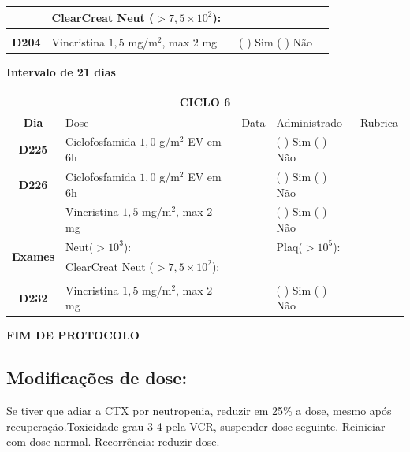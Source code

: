 \documentclass[11pt,a4paper,oldfontcommands]{memoir}
\begin{document}
\begin{center}
\begin{table}[H]
\begin{tabular}{p{1cm}p{6cm}|p{1cm}|p{3cm}|p{2.5cm}}
    \cline{2-5}
    \multicolumn{1}{c|}{\multirow{2}{*}{{}}}&\multicolumn{2}{l|}{ClearCreat Neut (\(>7,5\times10^2\)):}&{}&{}\\
    \hline
    \\
    \hline
    \multicolumn{1}{c|}{\multirow{1}{*}{\textbf{D204}}}&{Vincristina \(1,5\) mg/m\(^2\), max \(2\) mg}&&{(  ) Sim (  ) Não}&\\
    \hline
\end{tabular}
\end{table}
\textbf{Intervalo de 21 dias}
\begin{table}[H]
\begin{tabular}{p{1cm}p{6cm}|p{1cm}|p{3cm}|p{2.5cm}}
    \hline
	\multicolumn{5}{c}{\textbf{CICLO 6}}\\
	\hline
    \multicolumn{1}{c|}{\multirow{1}{*}{\textbf{Dia}}}&{Dose}&{Data}&{Administrado}&{Rubrica} \\
    \hline
    \multicolumn{1}{c|}{\multirow{1}{*}{\textbf{D225}}}&{Ciclofosfamida \(1,0\) g/m\(^2\) EV em 6h}&&{(  ) Sim (  ) Não}&\\
    \multicolumn{1}{c|}{\multirow{1}{*}{\textbf{D226}}}&{Ciclofosfamida \(1,0\) g/m\(^2\) EV em 6h}&&{(  ) Sim (  ) Não}&\\
    \multicolumn{1}{c|}{\multirow{1}{*}{\textbf{}}}&{Vincristina \(1,5\) mg/m\(^2\), max \(2\) mg}&&{(  ) Sim (  ) Não}&\\
    \hline
    \multicolumn{1}{c|}{\multirow{2}{*}{\textbf{Exames}}}&\multicolumn{2}{l|}{Neut(\(>10^3\)):}&{Plaq(\(>10^5\)):}&\\
    \cline{2-5}
    \multicolumn{1}{c|}{\multirow{2}{*}{{}}}&\multicolumn{2}{l|}{ClearCreat Neut (\(>7,5\times10^2\)):}&{}&{}\\
    \hline
    \\
    \hline
    \multicolumn{1}{c|}{\multirow{1}{*}{\textbf{D232}}}&{Vincristina \(1,5\) mg/m\(^2\), max \(2\) mg}&&{(  ) Sim (  ) Não}&\\
    \hline
\end{tabular}
\end{table}
\textbf{FIM DE PROTOCOLO}

\end{center}
\subsection{Modificações de dose:}
Se tiver que adiar a CTX por neutropenia, reduzir em 25\% a dose, mesmo após recuperação.Toxicidade grau 3-4 pela VCR, suspender dose seguinte. Reiniciar com dose normal. Recorrência: reduzir dose.
\end{document}
